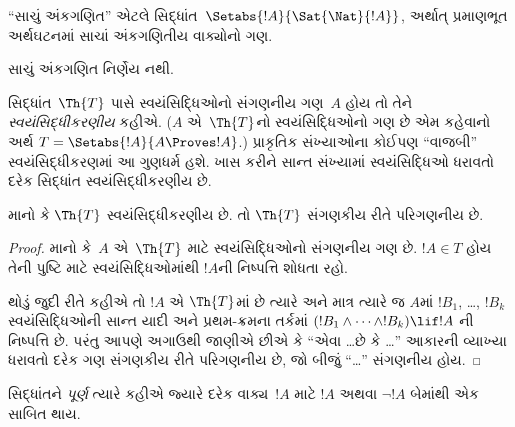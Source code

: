 ``સાચું અંકગણિત'' એટલે
સિદ્ધાંત~$\Setabs{!A}{ \Sat{\Nat}{!A}}$,
અર્થાત્ પ્રમાણભૂત અર્થઘટનમાં
સાચાં અંકગણિતીય વાક્યોનો ગણ.

\begin{cor}
સાચું અંકગણિત નિર્ણેય નથી.
\end{cor}
\endgroup


\begingroup
\makeatletter{}\makeatother


\label{guunit:OLP-0306}


સિદ્ધાંત~$\Th{T}$ પાસે
સ્વયંસિદ્ધિઓનો સંગણનીય ગણ~$A$
હોય તો તેને
\emph{સ્વયંસિદ્ધીકરણીય} કહીએ.
($A$ એ~$\Th{T}$નો
સ્વયંસિદ્ધિઓનો ગણ છે એમ
કહેવાનો અર્થ
$T = \Setabs{!A}{A \Proves !A}$.)
પ્રાકૃતિક સંખ્યાઓના કોઈપણ
``વાજબી'' સ્વયંસિદ્ધીકરણમાં
આ ગુણધર્મ હશે. ખાસ કરીને
સાન્ત સંખ્યામાં સ્વયંસિદ્ધિઓ
ધરાવતો દરેક સિદ્ધાંત
સ્વયંસિદ્ધીકરણીય છે.

\begin{lem}
માનો કે $\Th{T}$
સ્વયંસિદ્ધીકરણીય છે.
તો $\Th{T}$
સંગણકીય રીતે પરિગણનીય છે.
\end{lem}

\begin{proof}
માનો કે~$A$ એ~$\Th{T}$
માટે સ્વયંસિદ્ધિઓનો
સંગણનીય ગણ છે.
$!A \in T$ હોય તેની
પુષ્ટિ માટે સ્વયંસિદ્ધિઓમાંથી
$!A$ની નિષ્પત્તિ
શોધતા રહો.

થોડું જુદી રીતે કહીએ તો
$!A$ એ $\Th{T}$માં છે
ત્યારે અને માત્ર ત્યારે જ
$A$માં $!B_1$, \dots,
$!B_k$ સ્વયંસિદ્ધિઓની
સાન્ત યાદી અને પ્રથમ-ક્રમના
તર્કમાં
$(!B_1 \land \dots \land !B_k) \lif !A$
ની નિષ્પત્તિ છે.
પરંતુ આપણે અગાઉથી જાણીએ
છીએ કે ``એવા \dots છે કે
\dots'' આકારની વ્યાખ્યા
ધરાવતો દરેક ગણ સંગણકીય રીતે પરિગણનીય
છે, જો બીજું ``\dots''
સંગણનીય હોય.
\end{proof}
\endgroup


\begingroup
\makeatletter{}\makeatother


\label{guunit:OLP-0307}


સિદ્ધાંતને {\em પૂર્ણ} ત્યારે કહીએ
જ્યારે દરેક વાક્ય~$!A$ માટે
$!A$ અથવા $\lnot !A$
બેમાંથી એક સાબિત થાય.

